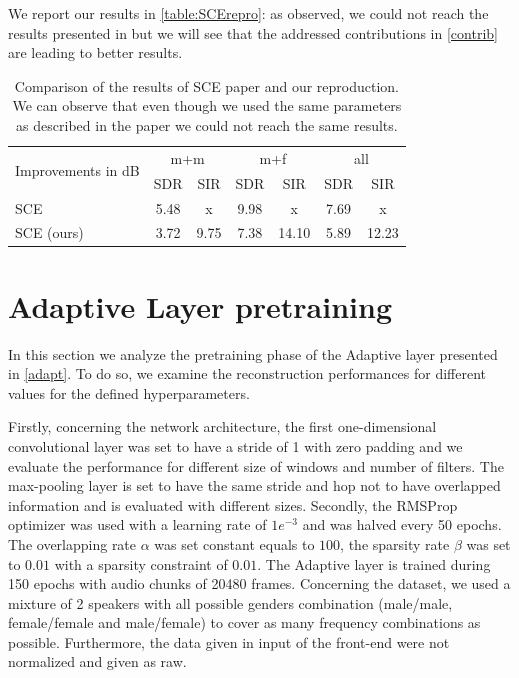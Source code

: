 \documentclass[master, tikz, final,11pt, dvipdfmx]{iscs-thesis}
\begin{document}
We report our results in \autoref{table:SCErepro}: as observed, we could not reach the results presented in \cite{SCE} but we will see that the addressed contributions in \autoref{contrib} are leading to better results.

\begin{table}[ht]
\centering
\begin{tabular}{l|c|c|c|c|c|c}
\multirow{2}{*}{Improvements in dB }& \multicolumn{2}{c|}{m+m} & \multicolumn{2}{c|}{m+f} & \multicolumn{2}{c}{all} \\ 
\cline{2-7} 
 & SDR & SIR & SDR & SIR & SDR & SIR \\ 
\hline 
SCE \cite{SCE} & 5.48 & x & 9.98 & x & 7.69 & x \\ 
SCE (ours) & 3.72 & 9.75 & 7.38 & 14.10 & 5.89 & 12.23 \\ 
\end{tabular}
\caption[Reproduction of SCE paper results]{Comparison of the results of SCE paper and our reproduction. We can observe that even though we used the same parameters as described in the paper we could not reach the same results.}
\label{table:SCErepro}
\end{table}

\section{Adaptive Layer pretraining}
\label{pre}

In this section we analyze the pretraining phase of the Adaptive layer presented in \autoref{adapt}. To do so, we examine the reconstruction performances for different values for the defined hyperparameters.

Firstly, concerning the network architecture, the first one-dimensional convolutional layer was set to have a stride of 1 with zero padding and we evaluate the performance for different size of windows and number of filters. The max-pooling layer is set to have the same stride and hop not to have overlapped information and is evaluated with different sizes. 
Secondly, the RMSProp optimizer was used with a learning rate of $1e^{-3}$ and was halved every 50 epochs. The overlapping rate $\alpha$ was set constant equals to $100$, the sparsity rate $\beta$ was set to $0.01$ with a sparsity constraint of $0.01$. The Adaptive layer is trained during 150 epochs with audio chunks of 20480 frames.
Concerning the dataset, we used a mixture of 2 speakers with all possible genders combination (male/male, female/female and male/female) to cover as many frequency combinations as possible. Furthermore, the data given in input of the front-end were not normalized and given as raw. 
\end{document}
